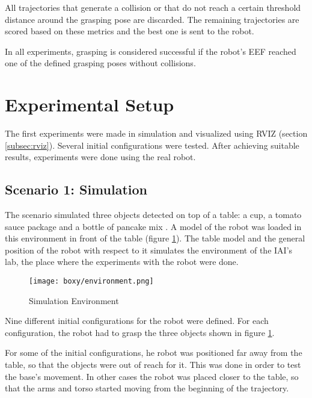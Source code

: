 All trajectories that generate a collision or that do not reach a certain threshold distance around the grasping pose are discarded. The remaining trajectories are scored based on these metrics and the best one is sent to the robot.

In all experiments, grasping is considered successful if the robot's EEF reached one of the defined grasping poses without collisions.

\section{Experimental Setup}

The first experiments were made in simulation and visualized using RVIZ (section \ref{subsec:rviz}). Several initial configurations were tested. After achieving suitable results, experiments were done using the real robot.


\subsection{Scenario 1: Simulation}

The scenario simulated three objects detected on top of a table: a cup, a tomato sauce package and a bottle of pancake mix . A model of the robot was loaded in this environment in front of the table (figure \ref{fig:env}). The table model and the general position of the robot with respect to it simulates the environment of the IAI's lab, the place where the experiments with the robot were done.

\begin{figure}[H]
	\centering
	{\texttt{[image: boxy/environment.png]}}
	\vspace{-12pt}
	\caption[Simulation Environment]{Simulation Environment}
	\vspace{-10pt}
	\label{fig:env}
\end{figure}

Nine different initial configurations for the robot were defined. For each configuration, the robot had to grasp the three objects shown in figure \ref{fig:env}.

For some of the initial configurations, he robot was positioned far away from the table, so that the objects were out of reach for it. This was done in order to test the base's movement. In other cases the robot was placed closer to the table, so that the arms and torso started moving from the beginning of the trajectory.



